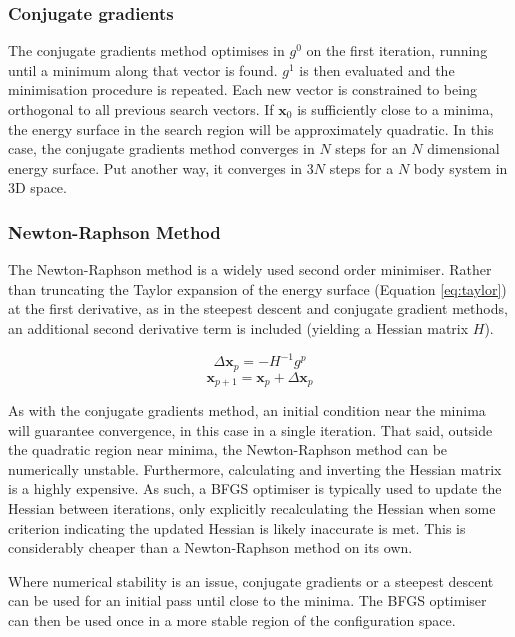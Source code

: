 \subsubsection{Conjugate gradients}
The conjugate gradients method optimises in $g^0$ on the first iteration, running until a minimum along that vector is found.
$g^1$ is then evaluated and the minimisation procedure is repeated. 
Each new vector is constrained to being orthogonal to all previous search vectors.
If $\mathbf{x}_0$ is sufficiently close to a minima, the energy surface in the search region will be approximately quadratic. 
In this case, the conjugate gradients method converges in $N$ steps for an $N$ dimensional energy surface. 
Put another way, it converges in $3N$ steps for a $N$ body system in 3D space.

\subsubsection{Newton-Raphson Method}
The Newton-Raphson method is a widely used second order minimiser.
Rather than truncating the Taylor expansion of the energy surface (Equation \ref{eq:taylor}) at the first derivative, as in the steepest descent and conjugate gradient methods, an additional second derivative term is included (yielding a Hessian matrix $H$).


\begin{equation}
\Delta \mathbf{x}_p = -H^{-1}g^p
\end{equation}
\begin{equation}
\mathbf{x}_{p+1} = \mathbf{x}_p + \Delta \mathbf{x}_p
\end{equation}

As with the conjugate gradients method, an initial condition near the minima will guarantee convergence, in this case in a single iteration.
That said, outside the quadratic region near minima, the Newton-Raphson method can be numerically unstable.
Furthermore, calculating and inverting the Hessian matrix is a highly expensive.
As such, a BFGS optimiser\cite{Shanno1970} is typically used to update the Hessian between iterations, only explicitly recalculating the Hessian when some criterion indicating the updated Hessian is likely inaccurate is met.
This is considerably cheaper than a Newton-Raphson method on its own.

Where numerical stability is an issue, conjugate gradients or a steepest descent can be used for an initial pass until close to the minima.
The BFGS optimiser can then be used once in a more stable region of the configuration space.


